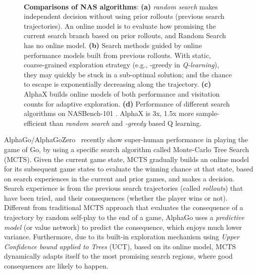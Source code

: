 \documentclass[10pt,twocolumn,letterpaper]{article}
\begin{document}
\iffalse 
The most successful subclass of MCTS is to a tree search policy \cite{kocsis2006bandit}.
\fi

\begin{figure}[t]
\centering 
{} \quad
{}\\
 \quad
{}
    \caption{ \textbf{Comparisons of NAS algorithms}: \textbf{(a)} \textit{random search} makes independent decision without using prior rollouts (previous search trajectories). An online model is to evaluate how promising the current search branch based on prior rollouts, and Random Search has no online model. \textbf{(b)} Search methods guided by online performance models built from previous rollouts. With static, coarse-grained exploration strategy (e.g., -greedy in \textit{Q-learning}), they may quickly be stuck in a sub-optimal solution; and the chance to escape is exponentially decreasing along the trajectory.  \textbf{(c)} AlphaX builds online models of both performance and visitation counts for adaptive exploration. \textbf{(d)} Performance of different search algorithms on NASBench-101 \cite{ying2019bench}. AlphaX is 3x, 1.5x more sample-efficient than \textit{random search} and \textit{-greedy} based Q learning.  }
\label{fig:teaser}
\end{figure}



AlphaGo/AlphaGoZero~\cite{silver2016mastering} recently show super-human performance in playing the game of Go, by using a specific search algorithm called Monte-Carlo Tree Search (MCTS)\cite{kocsis2006bandit,browne2012survey}. Given the current game state, MCTS gradually builds an online model for its subsequent game states to evaluate the winning chance at that state, based on search experiences in the current and prior games, and makes a decision. Search experience is from the previous search trajectories (called \emph{rollouts}) that have been tried, and their consequences (whether the player wins or not). Different from traditional MCTS approach that evaluates the consequence of a trajectory by random self-play to the end of a game, AlphaGo uses a \emph{predictive model} (or value network) to predict the consequence, which enjoys much lower variance. Furthermore, due to its built-in exploration mechanism using \textit{Upper Confidence bound applied to Trees} (UCT)\cite{auer2002finite}, based on its online model, MCTS dynamically adapts itself to the most promising search regions, where good consequences are likely to happen.
\end{document}
